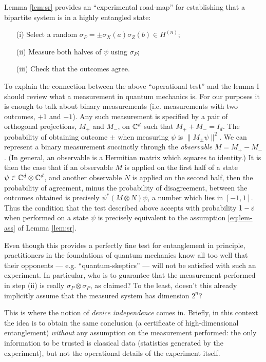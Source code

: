 Lemma \ref{lem:sr} provides an ``experimental road-map'' for establishing that a bipartite system is in a highly entangled state: 
\begin{itemize}
\item[(i)] Select a random $\sigma_P = \pm\sigma_X(a)\sigma_Z(b) \in H^{(n)}$;
\item[(ii)] Measure both halves of $\psi$ using $\sigma_P$;
\item[(iii)] Check that the outcomes agree.
\end{itemize}
To explain the connection between the above ``operational test'' and the lemma I should review what a measurement in quantum mechanics is. For our purposes it is enough to talk about binary measurements (i.e. measurements with two outcomes, $+1$ and $-1$). Any such measurement is specified by a pair of orthogonal projections, $M_+$ and $M_-$, on $\mathbb{C}^d$ such that $M_++M_- = I_d$. The probability of obtaining outcome $\pm$ when measuring $\psi$ is $\|M_\pm \psi\|^2$. We can represent a binary measurement succinctly through the \emph{observable} $M=M_+-M_-$. (In general, an observable is a Hermitian matrix which squares to identity.) It is then the case that if an observable $M$ is applied on the first half of a state $\psi\in\mathbb{C}^d\otimes\mathbb{C}^d$, and another observable $N$ is applied on the second half, then the probability of agreement, minus the probability of disagreement, between the outcomes obtained is precisely $\psi^*(M\otimes N)\psi$, a number which lies in $[-1,1]$. Thus the condition that the test described above accepts with probability $1-\varepsilon$ when performed on a state $\psi$ is precisely equivalent to the assumption \eqref{eq:lem-ass} of Lemma \ref{lem:sr}. 

Even though this provides a perfectly fine test for entanglement in principle, practitioners in the foundations of quantum mechanics know all too well that their opponents --- e.g. ``quantum-skeptics'' --- will not be satisfied with such an experiment. In particular, who is to guarantee that the measurement performed in step (ii) is really $\sigma_P\otimes\sigma_P$, as claimed? To the least, doesn't this already implicitly assume that the measured system has dimension $2^n$? 

This is where the notion of \emph{device independence} comes in. Briefly, in this context the idea is to obtain the same conclusion (a certificate of high-dimensional entanglement) \emph{without} any assumption on the measurement performed: the only information to be trusted is classical data (statistics generated by the experiment), but not the operational details of the experiment itself. 

